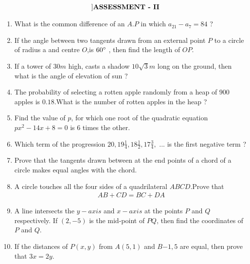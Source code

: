 \documentclass{article}
\providecommand{\brak}[1]{\ensuremath{\left(#1\right)}}
\begin{document}
\begin{align*}
	    \title[]{\textbf{ASSESSMENT - II}}
\end{align*}

\begin{enumerate}
		    \item What is the common difference of an $A.P$ in which $a_{21} - a_7 = 84$ ?
			        
			        \item If the angle between two tangents drawn from an external point $P$ to a circle of radius a and centre $O$,is $60\degree$ , then find the length of $OP$.
					    
					    \item If a tower of $30 m $ high, casts a shadow $10\sqrt{3} m$ long on the ground, then what is the angle of elevation of sun ?
						        
						        \item The probability of selecting a rotten apple randomly from a heap of $900$ apples is $0.18$.What is the number of rotten apples in the heap ?

								    \item Find the value of $p$, for which one root of the quadratic equation $px^{2} - 14x + 8 = 0$ is $6$ times the other.
									        
									        \item Which term of the progression $20,19\frac{1}{4},18\frac{1}{2},17\frac{3}{4},$ ... is the first negative term ?
											    
											    \item Prove that the tangents drawn between at the end points of a chord of a circle makes equal angles with the chord.
												        
												        \item A circle touches all the four sides of a quadrilateral $ABCD$.Prove that 
														    \begin{align*}
															            AB + CD = BC + DA
																        \end{align*}
																	    
																	        \item A line intersects the $y-axis$ and $x-axis$ at the points $P$ and $Q$ respectively. If $\brak{2,-5}$ is the mid-point of $P$$Q$, then find the coordinates of $P$ and $Q$.
																			    
																			    \item If the distances of $P\brak{x,y}$ from $A\brak{5,1}$ and $B{-1,5}$ are equal, then prove that $3x = 2y$.
																				        

\end{enumerate}
\end{document}
